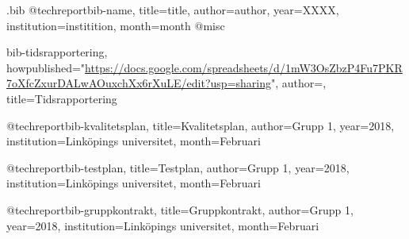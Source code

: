 \begin{filecontents*}{\jobname.bib}
@techreport{bib-name,
    title={title},
    author={author},
    year={XXXX},
    institution={institition},
    month={month}
}
@misc{bib-tidsrapportering,
    howpublished="\url{https://docs.google.com/spreadsheets/d/1mW3OsZbzP4Fu7PKR7oXfcZxurDALwAOuxchXx6rXuLE/edit?usp=sharing}",
    author={},
    title={Tidsrapportering}

}

@techreport{bib-kvalitetsplan,
    title={Kvalitetsplan},
    author={Grupp 1},
    year={2018},
    institution={Linköpings universitet},
    month={Februari}
}


@techreport{bib-testplan,
    title={Testplan},
    author={Grupp 1},
    year={2018},
    institution={Linköpings universitet},
    month={Februari}
}


@techreport{bib-gruppkontrakt,
    title={Gruppkontrakt},
    author={Grupp 1},
    year={2018},
    institution={Linköpings universitet},
    month={Februari}
}

\end{filecontents*}

